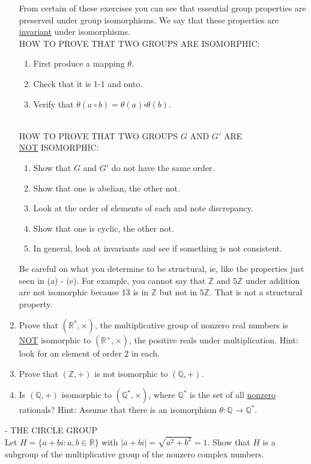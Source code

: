 \documentclass[12pt]{book}
\theoremstyle{definition}
\def\Z{\mathbb{Z}}
\begin{document}
\begin{enumerate}
From certain of these exercises you can see that essential group properties are preserved under group isomorphisms.  We say that these properties are \underline{invariant} under isomorphisms. \\[.1in]
HOW TO PROVE THAT TWO GROUPS ARE ISOMORPHIC:
\begin{enumerate}
\item First produce a mapping $\theta$.
\item Check that it is 1-1 and onto.
\item Verify that $\theta(a\circ b)=\theta(a)\square \theta(b)$.
\end{enumerate}
~\\[.2in]
HOW TO PROVE THAT TWO GROUPS $G$ AND $G'$ ARE\\ \underline{NOT} ISOMORPHIC:
\begin{enumerate}
\item Show that $G$ and $G'$ do not have the same order.
\item Show that one is abelian, the other not.
\item Look at the order of elements of each and note discrepancy.
\item Show that one is cyclic, the other not.
\item In general, look at invariants and see if something is not consistent.
\end{enumerate}

Be careful on what you determine to be structural, ie, like the properties just seen in (a) - (e).  For example, you cannot say that $\Z$ and $5\Z$ under addition are not isomorphic because 13 is in $\Z$ but not in $5\Z$.  That is not a structural property.

\item Prove that $ (\mathbb{R}^*,\times) $, the multiplicative group of nonzero real numbers is \underline{NOT} isomorphic to  $ (\mathbb{R}^+,\times) $, the positive reals under multiplication. Hint: look for an element of order 2 in each.
\item Prove that $ (\Z,+) $ is not isomorphic to $ (\mathbb{Q},+) $.
\item Is $ (\mathbb{Q},+) $ isomorphic to $ (\mathbb{Q}^*,\times) $, where $ \mathbb{Q}^* $ is the set of all \underline{nonzero} rationals? Hint: Assume that there is an isomorphism $ \theta: \mathbb{Q}\rightarrow \mathbb{Q}^* $. 

\end{enumerate}
\clearpage
{} - THE CIRCLE GROUP \\[.2in] 
Let $ H=\{a+bi:a,b\in \mathbb{R}\} $ with $ |a+bi|=\sqrt{a^2+b^2}=1. $
Show that $ H $ is a subgroup of the multiplicative group of the nonzero complex numbers. 
\end{document}
